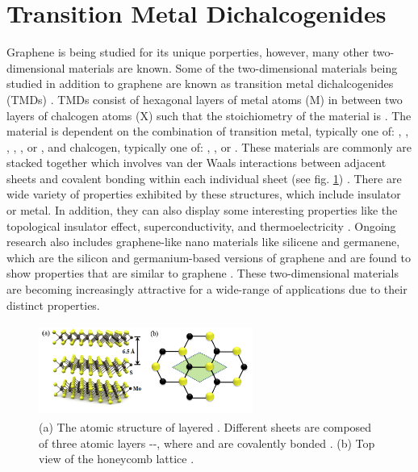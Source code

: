 \documentclass[%
 reprint,
 amsmath,amssymb,
 aps,
pra,
floatfix,
]{revtex4-1}
\begin{document}
\section{\label{sec:TMDs} Transition Metal Dichalcogenides}
Graphene is being studied for its unique porperties, however, many other two-dimensional materials are known. Some of the two-dimensional materials being studied in addition to graphene are known as transition metal dichalcogenides (TMDs) \cite{Mattheiss1973, Wilson1969}. TMDs consist of hexagonal layers of metal atoms (M) in between two layers of chalcogen atoms (X) such that the stoichiometry of the material is  \cite{grapheneLike2Dreview2013}. The material is dependent on the combination of transition metal, typically one of: , , , , , or , and chalcogen, typically one of: , , or  \cite{Wilson1969}. These materials are commonly are stacked together which involves van der Waals interactions between adjacent sheets and covalent bonding within each individual sheet (see fig. \ref{fig:mos2diagram}) \cite{grapheneLike2Dreview2013}. There are wide variety of properties exhibited by these structures, which include insulator or metal. In addition, they can also display some interesting properties like the topological insulator effect, superconductivity, and thermoelectricity \cite{Lang2012, Zhang2012, Gamble1975, Xie2009}. Ongoing research also includes graphene-like nano materials like silicene and germanene, which are the silicon and germanium-based versions of graphene and are found to show properties that are similar to graphene \cite{Takeda1994, Cahangirov2009}. These two-dimensional materials are becoming increasingly attractive for a wide-range of applications due to their distinct properties. 
\begin{figure}
\includegraphics[height=3cm, width=7cm]{../figs/mos2diagram}
\caption{(a) The atomic structure of layered . Different sheets are composed of three atomic layers --, where  and  are covalently bonded \cite{Kis2011, grapheneLike2Dreview2013}. (b) Top view of the honeycomb lattice \cite{grapheneLike2Dreview2013}.}
\label{fig:mos2diagram}
\end{figure}
\end{document}
